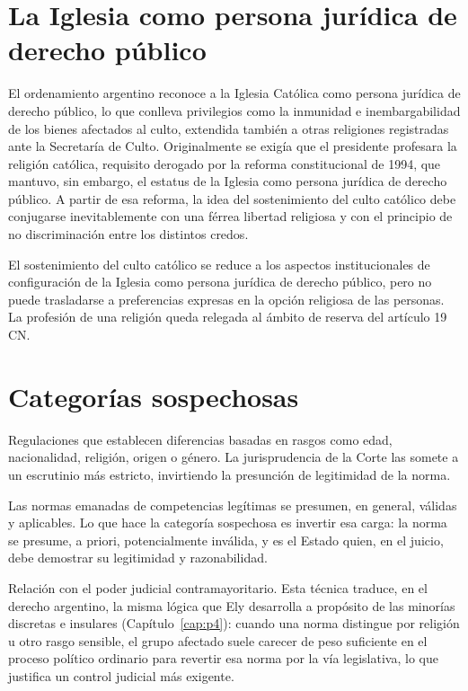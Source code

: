 \documentclass[12pt,oneside]{book}
\begin{document}
\section{La Iglesia como persona jurídica de derecho público}

El ordenamiento argentino reconoce a la Iglesia Católica como persona jurídica de
derecho público, lo que conlleva privilegios como la inmunidad e
inembargabilidad de los bienes afectados al culto, extendida también a otras
religiones registradas ante la Secretaría de Culto. Originalmente se exigía que el
presidente profesara la religión católica, requisito derogado por la reforma
constitucional de 1994, que mantuvo, sin embargo, el estatus de la Iglesia como
persona jurídica de derecho público. A partir de esa reforma, la idea del
sostenimiento del culto católico debe conjugarse inevitablemente con una férrea
libertad religiosa y con el principio de no discriminación entre los distintos
credos.

\begin{defbox}
El sostenimiento del culto católico se reduce a los aspectos institucionales de
configuración de la Iglesia como persona jurídica de derecho público, pero no
puede trasladarse a preferencias expresas en la opción religiosa de las personas.
La profesión de una religión queda relegada al ámbito de reserva del artículo 19
CN.
\end{defbox}

\section{Categorías sospechosas}

\begin{defbox}
Regulaciones que establecen diferencias basadas en rasgos como edad, nacionalidad,
religión, origen o género. La jurisprudencia de la Corte las somete a un
escrutinio más estricto, invirtiendo la presunción de legitimidad de la norma.
\end{defbox}

Las normas emanadas de competencias legítimas se presumen, en general, válidas y
aplicables. Lo que hace la categoría sospechosa es invertir esa carga: la norma se
presume, a priori, potencialmente inválida, y es el Estado quien, en el juicio,
debe demostrar su legitimidad y razonabilidad.

\begin{impbox}
Relación con el poder judicial contramayoritario. Esta técnica traduce, en el
derecho argentino, la misma lógica que Ely desarrolla a propósito de las minorías
discretas e insulares (Capítulo~\ref{cap:p4}): cuando una norma distingue por
religión u otro rasgo sensible, el grupo afectado suele carecer de peso suficiente
en el proceso político ordinario para revertir esa norma por la vía legislativa,
lo que justifica un control judicial más exigente.
\end{impbox}
\end{document}
